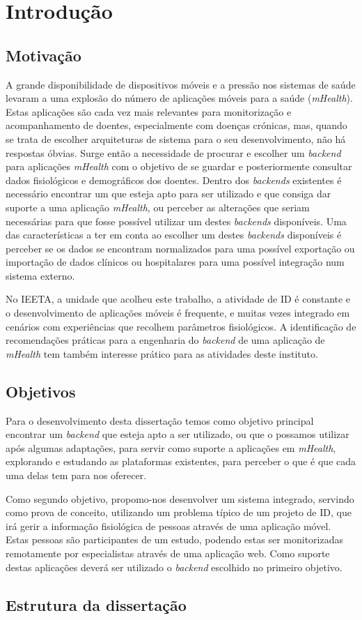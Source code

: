 \chapter{Introdu\c c\~ao}

\section{Motivação}

A grande disponibilidade de dispositivos móveis e a pressão nos sistemas de saúde levaram a uma explosão do número de aplicações móveis para a saúde (\textit{mHealth}). Estas aplicações são cada vez mais relevantes para monitorização e acompanhamento de doentes, especialmente com doenças crónicas\cite{mHealth-chronic-disease}, mas, quando se trata de escolher arquiteturas de sistema para o seu desenvolvimento, não há respostas óbvias. Surge então a necessidade de procurar e escolher um \textit{backend} para aplicações \textit{mHealth} com o objetivo de se guardar e posteriormente consultar dados fisiológicos e demográficos dos doentes.
Dentro dos \textit{backends} existentes é necessário encontrar um que esteja apto para ser utilizado e que consiga dar suporte a uma aplicação \textit{mHealth}, ou perceber as alterações que seriam necessárias para que fosse possível utilizar um destes \textit{backends} disponíveis. Uma das características a ter em conta ao escolher um destes \textit{backends} disponíveis é perceber se os dados se encontram normalizados para uma possível exportação ou importação de dados clínicos ou hospitalares para uma possível integração num sistema externo. \par
No \gls{IEETA}, a unidade que acolheu este trabalho, a atividade de \gls{ID} é constante e o desenvolvimento de aplicações móveis é frequente, e muitas vezes integrado em cenários com experiências que recolhem parâmetros fisiológicos. A identificação de recomendações práticas para a engenharia do \textit{backend} de uma aplicação de \textit{mHealth} tem também interesse prático para as atividades deste instituto.

\section{Objetivos}
Para o desenvolvimento desta dissertação temos como objetivo principal encontrar um \textit{backend} que esteja apto a ser utilizado, ou que o possamos utilizar após algumas adaptações, para servir como suporte a aplicações em \textit{mHealth}, explorando e estudando as plataformas existentes, para perceber o que é que cada uma delas tem para nos oferecer. \par
Como segundo objetivo, propomo-nos desenvolver um sistema integrado, servindo como prova de conceito, utilizando um problema típico de um projeto de \gls{ID}, que irá gerir a informação fisiológica de pessoas através de uma aplicação móvel. Estas pessoas são participantes de um estudo, podendo estas ser monitorizadas remotamente por especialistas através de uma aplicação web. Como suporte destas aplicações deverá ser utilizado o \textit{backend} escolhido no primeiro objetivo.

\section{Estrutura da dissertação}

\cleardoublepage
